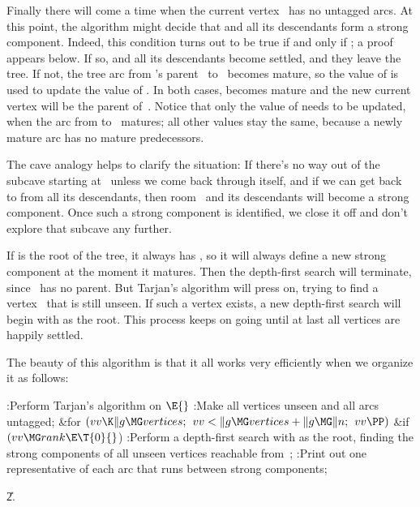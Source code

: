Finally there will come a time when the current vertex~ has no
untagged arcs. At this point, the
algorithm might decide that  and all its descendants form a strong
component. Indeed, this condition turns out to be true if and only if
; a proof appears below. If so,  and all its
descendants
become settled, and they leave the tree. If not, the tree arc from
's parent~ to~ becomes mature, so the value of  is
used to update the value of . In both cases, 
becomes mature
and the new current vertex will be the parent of~. Notice that only the
value of  needs to be updated, when the arc from 
to~
matures; all other values  stay the same, because a newly
mature arc has no mature predecessors.

The cave analogy helps to clarify the situation: If there's no way out
of the subcave starting at~ unless we come back through 
itself,
and if we can get back to  from all its descendants, then
room~ and its descendants will become a strong component. Once
such a strong component is identified, we close it off and don't
explore that subcave any further.

If  is the root of the tree, it always has ,
so it will always define a new strong component at the moment it matures.
Then the depth-first search will terminate, since ~has no parent.
But Tarjan's algorithm will press on, trying to find a vertex~ that is
still
unseen. If such a vertex exists,
a new depth-first search will begin with  as the root. This
process keeps on going until at last all vertices are happily settled.

The beauty of this algorithm is that it all works very efficiently
when we organize it as follows:

\Y\B\4:Perform Tarjan's algorithm on \X${}\E{}$\6
:Make all vertices unseen and all arcs untagged\X;\6
\&{for} ${}(\\{vv}\K\|g\MG\\{vertices};{}$ ${}\\{vv}<\|g\MG\\{vertices}+\|g\MG%
\|n;{}$ ${}\\{vv}\PP){}$\1\6
\&{if} ${}(\\{vv}\MG\\{rank}\E\T{0}{}$)\1\6
:Perform a depth-first search with  as the root, finding the
strong components of all unseen vertices reachable from~\X;\2\2\6
:Print out one representative of each arc that runs between strong
components\X;\par
\U2.\fi

